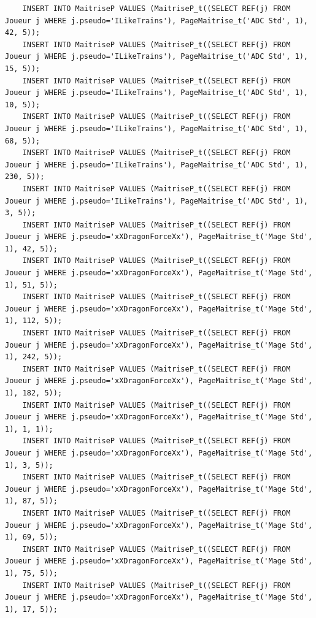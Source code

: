 \documentclass[a4paper,10pt]{report}
\begin{document}
\begin{lstlisting}
    INSERT INTO MaitriseP VALUES (MaitriseP_t((SELECT REF(j) FROM Joueur j WHERE j.pseudo='ILikeTrains'), PageMaitrise_t('ADC Std', 1), 42, 5));
    INSERT INTO MaitriseP VALUES (MaitriseP_t((SELECT REF(j) FROM Joueur j WHERE j.pseudo='ILikeTrains'), PageMaitrise_t('ADC Std', 1), 15, 5));
    INSERT INTO MaitriseP VALUES (MaitriseP_t((SELECT REF(j) FROM Joueur j WHERE j.pseudo='ILikeTrains'), PageMaitrise_t('ADC Std', 1), 10, 5));
    INSERT INTO MaitriseP VALUES (MaitriseP_t((SELECT REF(j) FROM Joueur j WHERE j.pseudo='ILikeTrains'), PageMaitrise_t('ADC Std', 1), 68, 5));
    INSERT INTO MaitriseP VALUES (MaitriseP_t((SELECT REF(j) FROM Joueur j WHERE j.pseudo='ILikeTrains'), PageMaitrise_t('ADC Std', 1), 230, 5));
    INSERT INTO MaitriseP VALUES (MaitriseP_t((SELECT REF(j) FROM Joueur j WHERE j.pseudo='ILikeTrains'), PageMaitrise_t('ADC Std', 1), 3, 5));
    INSERT INTO MaitriseP VALUES (MaitriseP_t((SELECT REF(j) FROM Joueur j WHERE j.pseudo='xXDragonForceXx'), PageMaitrise_t('Mage Std', 1), 42, 5));
    INSERT INTO MaitriseP VALUES (MaitriseP_t((SELECT REF(j) FROM Joueur j WHERE j.pseudo='xXDragonForceXx'), PageMaitrise_t('Mage Std', 1), 51, 5));
    INSERT INTO MaitriseP VALUES (MaitriseP_t((SELECT REF(j) FROM Joueur j WHERE j.pseudo='xXDragonForceXx'), PageMaitrise_t('Mage Std', 1), 112, 5));
    INSERT INTO MaitriseP VALUES (MaitriseP_t((SELECT REF(j) FROM Joueur j WHERE j.pseudo='xXDragonForceXx'), PageMaitrise_t('Mage Std', 1), 242, 5));
    INSERT INTO MaitriseP VALUES (MaitriseP_t((SELECT REF(j) FROM Joueur j WHERE j.pseudo='xXDragonForceXx'), PageMaitrise_t('Mage Std', 1), 182, 5));
    INSERT INTO MaitriseP VALUES (MaitriseP_t((SELECT REF(j) FROM Joueur j WHERE j.pseudo='xXDragonForceXx'), PageMaitrise_t('Mage Std', 1), 1, 1));
    INSERT INTO MaitriseP VALUES (MaitriseP_t((SELECT REF(j) FROM Joueur j WHERE j.pseudo='xXDragonForceXx'), PageMaitrise_t('Mage Std', 1), 3, 5));
    INSERT INTO MaitriseP VALUES (MaitriseP_t((SELECT REF(j) FROM Joueur j WHERE j.pseudo='xXDragonForceXx'), PageMaitrise_t('Mage Std', 1), 87, 5));
    INSERT INTO MaitriseP VALUES (MaitriseP_t((SELECT REF(j) FROM Joueur j WHERE j.pseudo='xXDragonForceXx'), PageMaitrise_t('Mage Std', 1), 69, 5));
    INSERT INTO MaitriseP VALUES (MaitriseP_t((SELECT REF(j) FROM Joueur j WHERE j.pseudo='xXDragonForceXx'), PageMaitrise_t('Mage Std', 1), 75, 5));
    INSERT INTO MaitriseP VALUES (MaitriseP_t((SELECT REF(j) FROM Joueur j WHERE j.pseudo='xXDragonForceXx'), PageMaitrise_t('Mage Std', 1), 17, 5));



\end{lstlisting}
\end{document}
